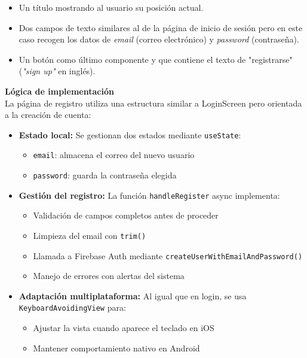 \documentclass[twoside, openright, 11pt]{report}
\begin{document}
					\begin{itemize}
						\item Un título mostrando al usuario su posición actual.
						\item Dos campos de texto similares al de la página de inicio de sesión pero en este caso recogen los datos de \textit{email} (correo electrónico) y \textit{password} (contraseña).
						\item Un botón como último componente y que contiene el texto de "registrarse" (\textit{"sign up"} en inglés).
					\end{itemize}
				
					
					\textbf{Lógica de implementación}\\
					La página de registro utiliza una estructura similar a LoginScreen pero orientada a la creación de cuenta:
					
					\begin{itemize}
						\item \textbf{Estado local:} Se gestionan dos estados mediante \texttt{useState}:
						\begin{itemize}
							\item \texttt{email}: almacena el correo del nuevo usuario
							\item \texttt{password}: guarda la contraseña elegida
						\end{itemize}
						
						\item \textbf{Gestión del registro:} La función \texttt{handleRegister} async implementa:
						\begin{itemize}
							\item Validación de campos completos antes de proceder
							\item Limpieza del email con \texttt{trim()}
							\item Llamada a Firebase Auth mediante \texttt{createUserWithEmailAndPassword()}
							\item Manejo de errores con alertas del sistema
						\end{itemize}
						
						\item \textbf{Adaptación multiplataforma:} Al igual que en login, se usa \texttt{KeyboardAvoidingView} para:
						\begin{itemize}
							\item Ajustar la vista cuando aparece el teclado en iOS
							\item Mantener comportamiento nativo en Android
						\end{itemize}
					\end{itemize}
					
\end{document}
